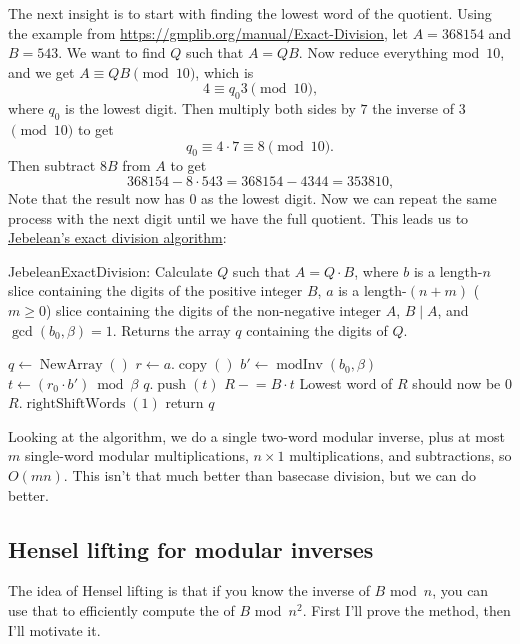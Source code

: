 \documentclass{computer-arithmetic}
\begin{document}
The next insight is to start with finding the lowest word of the
quotient. Using the example from
\url{https://gmplib.org/manual/Exact-Division}, let \(A = 368154\) and
\(B = 543\). We want to find \(Q\) such that \(A = QB\). Now reduce
everything mod~\(10\), and we get \(A ≡ QB \pmod{10}\), which is
\[
  4 ≡ q_0 3 \pmod{10}\text{,}
\]
where \(q_0\) is the lowest digit. Then multiply both sides by \(7\) the
inverse of \(3\) \(\pmod{10}\) to get
\[
  q_0 ≡ 4 ⋅ 7 ≡ 8 \pmod{10}\text{.}
\]
Then subtract \(8B\) from \(A\) to get
\[
  368154 - 8 ⋅ 543 = 368154 - 4344 = 353810\text{,}
\]
Note that the result now has \(0\) as the lowest digit. Now we can
repeat the same process with the next digit until we have the full
quotient. This leads us to
\href{https://www.sciencedirect.com/science/article/pii/S0747717183710126}{Jebelean's
  exact division algorithm}:

\begin{algorithm}
  \caption{JebeleanExactDivision: Calculate \(Q\) such that
    \(A = Q ⋅ B\), where \(b\) is a length-\(n\) slice containing the
    digits of the positive integer \(B\), \(a\) is a
    length-\((n + m)\) (\(m ≥ 0\)) slice containing the digits of the
    non-negative integer \(A\), \(B \mid A\), and
    \(\gcd(b_0, β) = 1\). Returns the array \(q\) containing the
    digits of \(Q\).}
  \begin{algorithmic}[1]
    \State \(q ← \operatorname{NewArray}()\)
    \State \(r ← a.\operatorname{copy}()\)
    \State \(b' ← \operatorname{modInv}(b_0, β)\)
    \State \(t ← (r_0 ⋅ b') \bmod β\)
    \State \(q.\operatorname{push}(t)\)
    \State \(R \mathrel{-}= B ⋅ t\)
    \Comment Lowest word of \(R\) should now be \(0\)
    \State \(R.\operatorname{rightShiftWords}(1)\)
    \EndWhile
    \State return \(q\)
\end{algorithmic}
\end{algorithm}

Looking at the algorithm, we do a single two-word modular inverse,
plus at most \(m\) single-word modular multiplications, \(n × 1\)
multiplications, and subtractions, so \(O(mn)\). This isn't that much
better than basecase division, but we can do better.

\subsection{Hensel lifting for modular inverses}

The idea of Hensel lifting is that if you know the inverse of \(B\)
mod~\(n\), you can use that to efficiently compute the of \(B\)
mod~\(n^2\). First I'll prove the method, then I'll motivate it.
\end{document}
